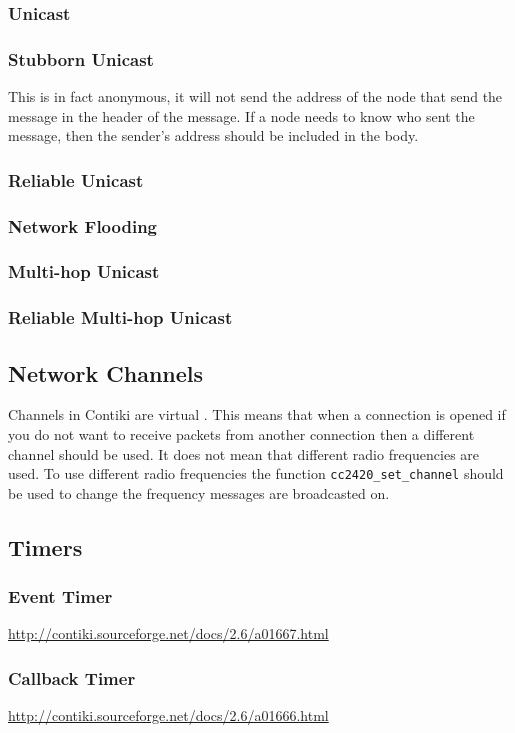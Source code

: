 \subsubsection{Unicast}

\subsubsection{Stubborn Unicast}

This is in fact anonymous, it will not send the address of the node that send the message in the header of the message. If a node needs to know who sent the message, then the sender's address should be included in the body.

\subsubsection{Reliable Unicast}

\subsubsection{Network Flooding}

\subsubsection{Multi-hop Unicast}

\subsubsection{Reliable Multi-hop Unicast}


\subsection{Network Channels}

Channels in Contiki are virtual \cite{tel-aviv-contiki-exercises}. This means that when a connection is opened if you do not want to receive packets from another connection then a different channel should be used. It does not mean that different radio frequencies are used. To use different radio frequencies the function \verb|cc2420_set_channel| should be used to change the frequency messages are broadcasted on.


\subsection{Timers}

\subsubsection{Event Timer}

\url{http://contiki.sourceforge.net/docs/2.6/a01667.html}

\subsubsection{Callback Timer}

\url{http://contiki.sourceforge.net/docs/2.6/a01666.html}
